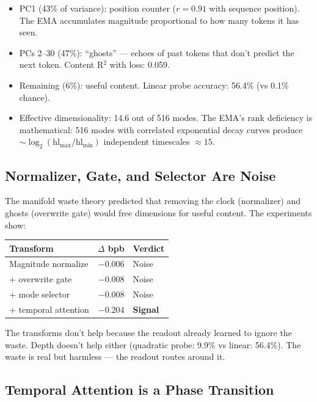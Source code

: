 \documentclass[11pt,a4paper]{report}
\begin{document}
\begin{itemize}[nosep]
\item PC1 (43\% of variance): position counter ($r = 0.91$ with sequence position). The EMA accumulates magnitude proportional to how many tokens it has seen.
\item PCs 2--30 (47\%): ``ghosts'' --- echoes of past tokens that don't predict the next token. Content R$^2$ with loss: 0.059.
\item Remaining (6\%): useful content. Linear probe accuracy: 56.4\% (vs 0.1\% chance).
\item Effective dimensionality: 14.6 out of 516 modes. The EMA's rank deficiency is mathematical: 516 modes with correlated exponential decay curves produce $\sim \log_2(\text{hl}_{\max}/\text{hl}_{\min})$ independent timescales $\approx 15$.
\end{itemize}

\subsection{Normalizer, Gate, and Selector Are Noise}

The manifold waste theory predicted that removing the clock (normalizer) and ghosts (overwrite gate) would free dimensions for useful content. The experiments show:

\begin{table}[h]
\centering
\begin{tabular}{lrl}
\toprule
\textbf{Transform} & \textbf{$\Delta$ bpb} & \textbf{Verdict} \\
\midrule
Magnitude normalize & $-0.006$ & Noise \\
+ overwrite gate & $-0.008$ & Noise \\
+ mode selector & $-0.008$ & Noise \\
+ temporal attention & $-0.204$ & \textbf{Signal} \\
\bottomrule
\end{tabular}
\end{table}

The transforms don't help because the readout already learned to ignore the waste. Depth doesn't help either (quadratic probe: 9.9\% vs linear: 56.4\%). The waste is real but harmless --- the readout routes around it.

\subsection{Temporal Attention is a Phase Transition}
\end{document}
